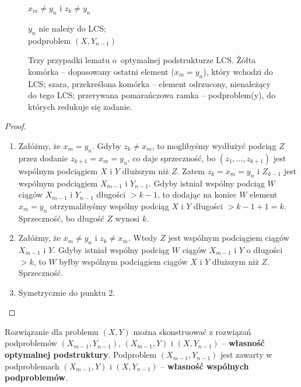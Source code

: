 \begin{figure}[ht]
\begin{minipage}[t]{0.31\textwidth}
		\par\smallskip
		{\footnotesize $x_m \neq y_n$ i $z_k \neq y_n$\par
			$y_n$ nie należy do LCS; \\ podproblem $(X, Y_{n-1})$}
	\end{minipage}
	\caption{Trzy przypadki lematu o~optymalnej podstrukturze LCS. Żółta komórka --
		dopasowany ostatni element ($x_m = y_n$), który wchodzi do LCS; szara,
		przekreślona komórka -- element odrzucony, nienależący do tego LCS;
		przerywana pomarańczowa ramka -- podproblem(y), do których redukuje się zadanie.}
	\label{fig:lcs:cases}
\end{figure}

\begin{proof} ~
	\begin{enumerate}
		\item Załóżmy, że $x_m = y_n$. Gdyby $z_k \neq x_m$, to moglibyśmy wydłużyć podciąg $Z$ przez dodanie $z_{k+1} = x_m = y_n$, co daje sprzeczność, bo $(z_1, \dots, z_{k+1})$ jest wspólnym podciągiem $X$ i $Y$ dłuższym niż $Z$. Zatem $z_k = x_m = y_n$ i $Z_{k-1}$ jest wspólnym podciągiem $X_{m-1}$ i $Y_{n-1}$. Gdyby istniał wspólny podciąg $W$ ciągów $X_{m-1}$ i $Y_{n-1}$ długości $> k - 1$, to dodając na koniec $W$ element $x_m = y_n$ otrzymalibyśmy wspólny podciąg $X$ i $Y$ długości $> k - 1 + 1 = k$. Sprzeczność, bo długość $Z$ wynosi $k$.
		\item Załóżmy, że $x_m \neq y_n$ i $z_k \neq x_m$. Wtedy $Z$ jest wspólnym podciągiem ciągów $X_{m-1}$ i $Y$. Gdyby istniał wspólny podciąg $W$ ciągów $X_{m-1}$ i $Y$ o długości $> k$, to $W$ byłby wspólnym podciągiem ciągów $X$ i $Y$ dłuższym niż $Z$. Sprzeczność.
		\item Symetrycznie do punktu 2.
	\end{enumerate}
\end{proof}

Rozwiązanie dla problemu $(X, Y)$ można skonstruować z rozwiązań podproblemów $(X_{m-1}, Y_{n-1})$, $(X_{m-1}, Y)$ i $(X, Y_{n-1})$ -- \textbf{własność optymalnej podstruktury}.
Podproblem $(X_{m-1}, Y_{n-1})$ jest zawarty w podproblemach $(X_{m-1}, Y)$ i $(X, Y_{n-1})$ -- \textbf{własność wspólnych podproblemów}.

